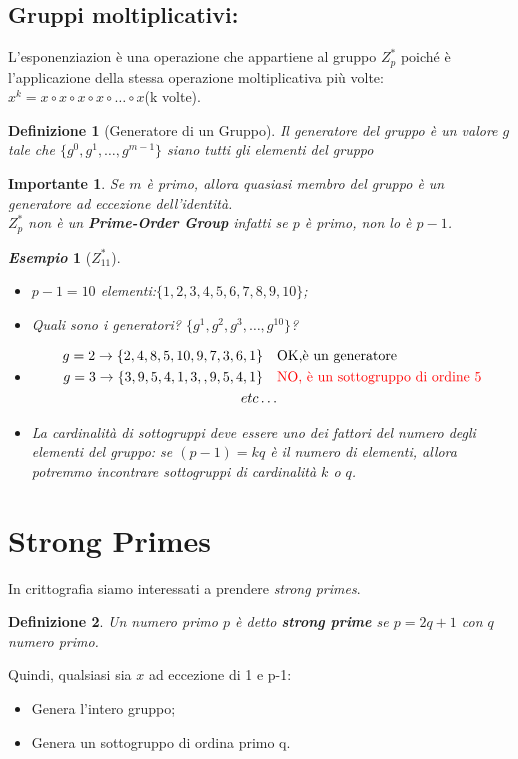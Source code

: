 \documentclass{book}
\newtheorem{Definizione}{\textbf{Definizione}}
\newtheorem*{Importante}{\textbf{Importante}}
\newtheorem{esempio}{\emph{Esempio}}
\begin{document}
\subsection{Gruppi moltiplicativi:\@exponentiation}
L'esponenziazion è una operazione che appartiene al gruppo \(Z_{p}^{*}\) poiché è l'applicazione della stessa operazione moltiplicativa più volte:\(x^{k}=x\circ x\circ x\circ x\circ \ldots \circ x\)(k volte).
\begin{Definizione}[Generatore di un Gruppo]
    Il generatore del gruppo è un valore \(g\) tale che \( \{g^{0},g^{1},\ldots ,g^{m-1} \} \) siano tutti gli elementi del gruppo
\end{Definizione}
\begin{Importante}
    Se \(m\) è primo, allora quasiasi membro del gruppo è un generatore ad eccezione dell'identità\@.\\
    \(Z_{p}^{*}\) non è un \textbf{Prime-Order Group} infatti se \(p\) è primo, non lo è \(p-1\).
\end{Importante}
\newpage
\begin{esempio}[\(Z_{11}^{*}\)]
    \begin{itemize}
        \item \(p-1=10\) elementi:\( \{1,2,3,4,5,6,7,8,9,10 \} \);
        \item Quali sono i generatori? \( \{g^{1},g^{2},g^{3},\ldots ,g^{10}\} \)?
        \item \begin{align*}
                  g=2\rightarrow \{2,4,8,5,10,9,7,3,6,1\}\quad & \text{OK,è un generatore}                                \\
                  g=3\rightarrow \{3,9,5,4,1,3,,9,5,4,1\}\quad & \text{\textcolor{red}{NO, è un sottogruppo di ordine 5}} \\
                  etc\ldots
              \end{align*}
        \item La cardinalità di sottogruppi deve essere uno dei fattori del numero degli elementi del gruppo: se \((p-1)=kq\) è il numero di elementi, allora potremmo incontrare sottogruppi di cardinalità \(k\) o \(q\).
    \end{itemize}
\end{esempio}
\section{Strong Primes}
In crittografia siamo interessati a prendere \emph{strong primes}.
\begin{Definizione}
    Un numero primo \(p\) è detto \textbf{strong prime} se \(p=2q+1\) con \(q\) numero primo.
\end{Definizione}
Quindi, qualsiasi sia \(x\) ad eccezione di 1 e p-1:\begin{itemize}
    \item Genera l'intero gruppo;
    \item Genera un sottogruppo di ordina primo q.
\end{itemize}
\end{document}
